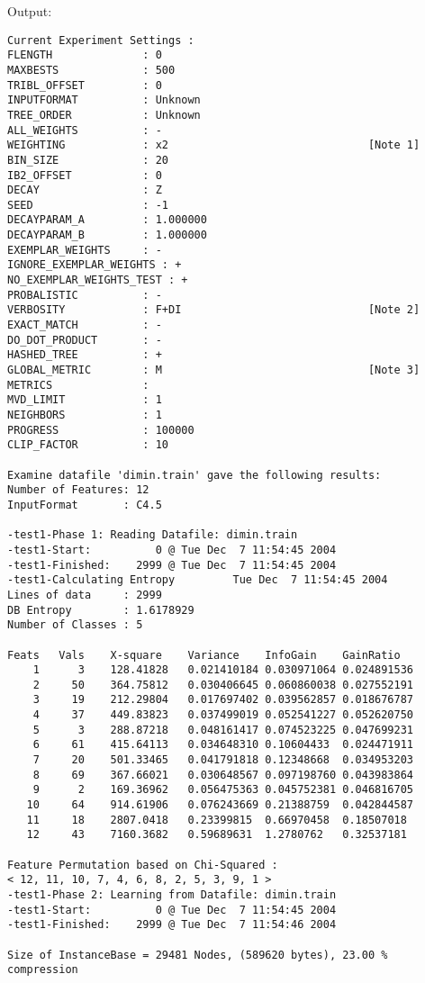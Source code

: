 Output:
\begin{footnotesize}
\begin{verbatim}
Current Experiment Settings :
FLENGTH              : 0
MAXBESTS             : 500
TRIBL_OFFSET         : 0
INPUTFORMAT          : Unknown
TREE_ORDER           : Unknown
ALL_WEIGHTS          : -
WEIGHTING            : x2                               [Note 1]
BIN_SIZE             : 20
IB2_OFFSET           : 0
DECAY                : Z
SEED                 : -1
DECAYPARAM_A         : 1.000000
DECAYPARAM_B         : 1.000000
EXEMPLAR_WEIGHTS     : -
IGNORE_EXEMPLAR_WEIGHTS : +
NO_EXEMPLAR_WEIGHTS_TEST : +
PROBALISTIC          : -
VERBOSITY            : F+DI                             [Note 2]
EXACT_MATCH          : -
DO_DOT_PRODUCT       : -
HASHED_TREE          : +
GLOBAL_METRIC        : M                                [Note 3]
METRICS              : 
MVD_LIMIT            : 1
NEIGHBORS            : 1
PROGRESS             : 100000
CLIP_FACTOR          : 10

Examine datafile 'dimin.train' gave the following results:
Number of Features: 12
InputFormat       : C4.5

-test1-Phase 1: Reading Datafile: dimin.train
-test1-Start:          0 @ Tue Dec  7 11:54:45 2004
-test1-Finished:    2999 @ Tue Dec  7 11:54:45 2004
-test1-Calculating Entropy         Tue Dec  7 11:54:45 2004
Lines of data     : 2999
DB Entropy        : 1.6178929
Number of Classes : 5

Feats	Vals	X-square	Variance	InfoGain	GainRatio
    1      3	128.41828	0.021410184	0.030971064	0.024891536
    2     50	364.75812	0.030406645	0.060860038	0.027552191
    3     19	212.29804	0.017697402	0.039562857	0.018676787
    4     37	449.83823	0.037499019	0.052541227	0.052620750
    5      3	288.87218	0.048161417	0.074523225	0.047699231
    6     61	415.64113	0.034648310	0.10604433	0.024471911
    7     20	501.33465	0.041791818	0.12348668	0.034953203
    8     69	367.66021	0.030648567	0.097198760	0.043983864
    9      2	169.36962	0.056475363	0.045752381	0.046816705
   10     64	914.61906	0.076243669	0.21388759	0.042844587
   11     18	2807.0418	0.23399815	0.66970458	0.18507018
   12     43	7160.3682	0.59689631	1.2780762	0.32537181

Feature Permutation based on Chi-Squared :
< 12, 11, 10, 7, 4, 6, 8, 2, 5, 3, 9, 1 >
-test1-Phase 2: Learning from Datafile: dimin.train
-test1-Start:          0 @ Tue Dec  7 11:54:45 2004
-test1-Finished:    2999 @ Tue Dec  7 11:54:46 2004

Size of InstanceBase = 29481 Nodes, (589620 bytes), 23.00 % compression


\end{verbatim}
\end{footnotesize}

